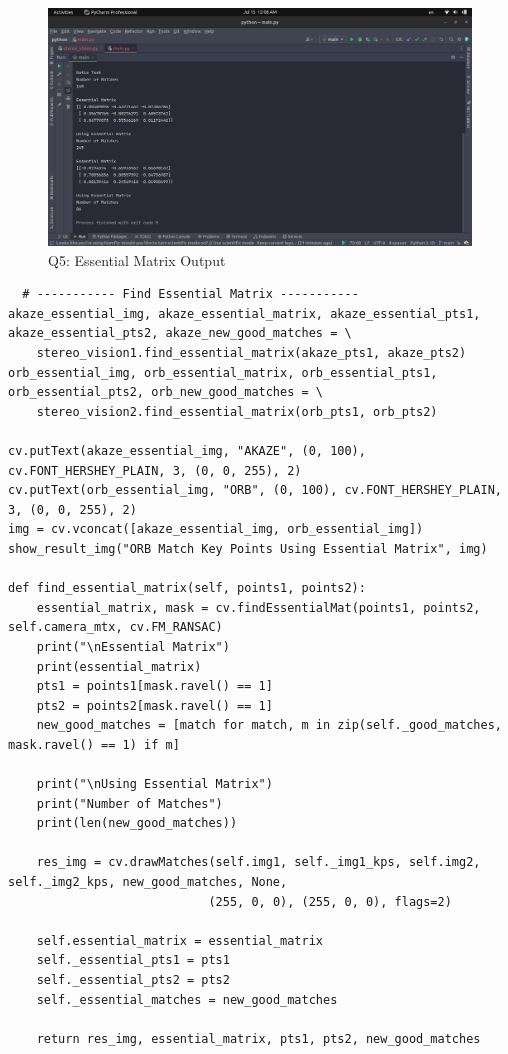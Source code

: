 \documentclass[a4paper, 12pt]{article}
\begin{document}
    \begin{figure}
		\caption{Q5: Essential Matrix Output}
		\includegraphics[scale=0.25]{img/essential_matrix2.png}
	\end{figure}

    \begin{lstlisting}
  # ----------- Find Essential Matrix -----------
akaze_essential_img, akaze_essential_matrix, akaze_essential_pts1, akaze_essential_pts2, akaze_new_good_matches = \
    stereo_vision1.find_essential_matrix(akaze_pts1, akaze_pts2)
orb_essential_img, orb_essential_matrix, orb_essential_pts1, orb_essential_pts2, orb_new_good_matches = \
    stereo_vision2.find_essential_matrix(orb_pts1, orb_pts2)

cv.putText(akaze_essential_img, "AKAZE", (0, 100), cv.FONT_HERSHEY_PLAIN, 3, (0, 0, 255), 2)
cv.putText(orb_essential_img, "ORB", (0, 100), cv.FONT_HERSHEY_PLAIN, 3, (0, 0, 255), 2)
img = cv.vconcat([akaze_essential_img, orb_essential_img])
show_result_img("ORB Match Key Points Using Essential Matrix", img)

def find_essential_matrix(self, points1, points2):
    essential_matrix, mask = cv.findEssentialMat(points1, points2, self.camera_mtx, cv.FM_RANSAC)
    print("\nEssential Matrix")
    print(essential_matrix)
    pts1 = points1[mask.ravel() == 1]
    pts2 = points2[mask.ravel() == 1]
    new_good_matches = [match for match, m in zip(self._good_matches, mask.ravel() == 1) if m]

    print("\nUsing Essential Matrix")
    print("Number of Matches")
    print(len(new_good_matches))

    res_img = cv.drawMatches(self.img1, self._img1_kps, self.img2, self._img2_kps, new_good_matches, None,
                            (255, 0, 0), (255, 0, 0), flags=2)

    self.essential_matrix = essential_matrix
    self._essential_pts1 = pts1
    self._essential_pts2 = pts2
    self._essential_matches = new_good_matches

    return res_img, essential_matrix, pts1, pts2, new_good_matches
    \end{lstlisting}
\end{document}
